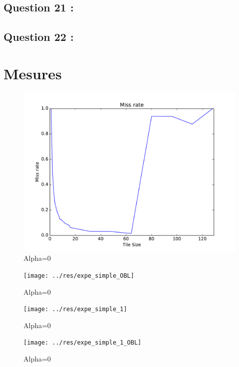\documentclass[11pt,a4paper]{article}
\begin{document}
	\subsection{Question 21 :}

	\subsection{Question 22 :}
	\section{Mesures}
	\begin{figure}[htbp]
		\centering
		\includegraphics[width=0.9\linewidth]{../res/expe_simple}
		\caption{Alpha=0}
		\label{fig:0}
	\end{figure}
	\begin{figure}[htbp]
		\centering
		\texttt{[image: ../res/expe\_simple\_OBL]}
		\caption{Alpha=0}
		\label{fig:1}
	\end{figure}
	\begin{figure}[htbp]
		\centering
		\texttt{[image: ../res/expe\_simple\_1]}
		\caption{Alpha=0}
		\label{fig:0}
	\end{figure}
	\begin{figure}[htbp]
		\centering
		\texttt{[image: ../res/expe\_simple\_1\_OBL]}
		\caption{Alpha=0}
		\label{fig:1}
	\end{figure}
	
\end{document}
